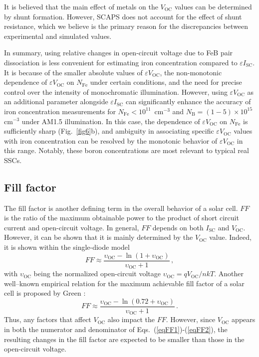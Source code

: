 \documentclass[a4paper,fleqn]{cas-sc}
\begin{document}
It is believed \cite{YangHandbookPVSi} that the main effect of metals on the $V_\mathrm{OC}$ values can be determined by shunt formation.
However, SCAPS does not account for the effect of shunt resistance,
which we believe is the primary reason for the discrepancies between experimental and simulated values.

In summary, using relative changes in open-circuit voltage due to FeB pair dissociation is less convenient
for estimating iron concentration compared to $\varepsilon I_\mathrm{SC}$.
It is because of the smaller absolute values of $\varepsilon V_\mathrm{OC}$,
the non-monotonic dependence of $\varepsilon V_\mathrm{OC}$ on $N_\mathrm{Fe}$ under certain conditions,
and the need for precise control over the intensity of monochromatic illumination.
However, using $\varepsilon V_\mathrm{OC}$ as an additional parameter alongside $\varepsilon I_\mathrm{SC}$
can significantly enhance the accuracy of iron concentration measurements for $N_\mathrm{Fe}<10^{11}$~cm$^{-3}$
and $N_\mathrm{B}=(1-5)\times10^{15}$cm$^{-3}$ under AM1.5 illumination.
In this case, the dependence of $\varepsilon V_\mathrm{OC}$ on $N_\mathrm{Fe}$ is sufficiently sharp (Fig.~\ref{fig6}b),
and ambiguity in associating specific $\varepsilon V_\mathrm{OC}$ values with iron concentration can be resolved
by the monotonic behavior of $\varepsilon V_\mathrm{OC}$ in this range.
Notably, these boron concentrations are most relevant to typical real SSCs.



\subsection{Fill factor}
The fill factor is another defining term in the overall behavior of a solar cell.
$FF$ is the ratio of the maximum obtainable power to the product of short circuit current and open-circuit voltage.
In general, $FF$ depends on both $I_\mathrm{SC}$ and $V_\mathrm{OC}$.
However, it can be shown that it is mainly determined by the $V_\mathrm{OC}$ value.
Indeed, it is shown \cite{YangHandbookPVSi} within the single-diode model
\begin{equation}
\label{eqFF1}
    FF \approx \frac{\upsilon_\mathrm{OC}-\ln\left(1+\upsilon_\mathrm{OC}\right)}{\upsilon_\mathrm{OC}+1} \,,
\end{equation}
with $\upsilon_\mathrm{OC}$ being the normalized open-circuit voltage
$\upsilon_\mathrm{OC}=qV_\mathrm{OC}/nkT$.
Another well--known empirical relation for the maximum achievable fill factor of a solar cell is proposed by Green \cite{Green1981,Green1982}:
\begin{equation}
\label{eqFF2}
    FF \approx \frac{\upsilon_\mathrm{OC}-\ln\left(0.72+\upsilon_\mathrm{OC}\right)}{\upsilon_\mathrm{OC}+1} \,.
\end{equation}
Thus, any factors that affect $V_\mathrm{OC}$ also impact the $FF$.
However, since $V_\mathrm{OC}$ appears in both the numerator and denominator of Eqs.~(\ref{eqFF1})-(\ref{eqFF2}),
the resulting changes in the fill factor are expected to be smaller than those in the open-circuit voltage.
\end{document}
